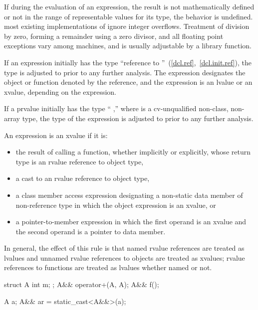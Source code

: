 \pnum
{}%
%
%
%
%
If during the evaluation of an expression, the result is not
mathematically defined or not in the range of representable values for
its type, the behavior is undefined.
\enternote 
{}%
most existing implementations of \Cpp ignore integer overflows.
Treatment of division by zero, forming a remainder using a zero divisor,
and all floating point exceptions vary among machines, and is usually
adjustable by a library function.
\exitnote 

\pnum
{}%
If an expression initially has the type ``reference to
''~(\ref{dcl.ref},~\ref{dcl.init.ref}), the type is adjusted to
 prior to any further analysis. The expression designates the
object or function denoted by the reference, and the expression
is an lvalue or an xvalue, depending on the expression.

\pnum
If a prvalue initially has the type ``\cv{} ,'' where
 is a cv-unqualified non-class, non-array type, the type of
the expression is adjusted to  prior to any further analysis.

\pnum
{}%
\enternote
An expression is an xvalue if it is:
\begin{itemize}
\item the result of calling a function, whether implicitly or explicitly,
whose return type is an rvalue reference to object type,

\item a cast to an rvalue reference to object type,

\item a class member access expression designating a non-static data member
of non-reference type
in which the object expression is an xvalue, or

\item a  pointer-to-member expression in which the first operand is
an xvalue and the second operand is a pointer to data member.
\end{itemize}
In general, the effect of this rule is that named rvalue references are
treated as lvalues and unnamed rvalue references to objects are treated as
xvalues; rvalue references to functions are treated as lvalues whether named or not.
\exitnote

\enterexample
\begin{codeblock}
struct A {
  int m;
};
A&& operator+(A, A);
A&& f();

A a;
A&& ar = static_cast<A&&>(a);
\end{codeblock}

